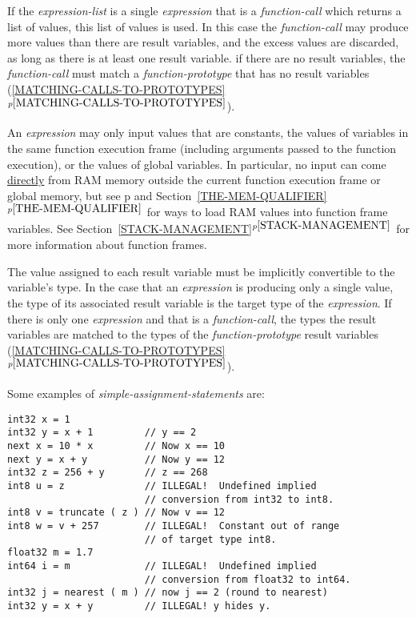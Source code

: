 \documentclass[12pt]{article}
\newcommand{\itemref}[1]{\ref{#1}$^{p\pageref{#1}}$}
\newcommand{\pagref}[1]{p\pageref{#1}}
\newenvironment{indpar}[1][0.3in]%
	{\begin{list}{}%
		     {\setlength{\itemsep}{0in}%
		      \setlength{\topsep}{0in}%
		      \setlength{\parsep}{1ex}%
		      \setlength{\labelwidth}{#1}%
		      \setlength{\leftmargin}{#1}%
		      \addtolength{\leftmargin}{\labelsep}}%
	 \item}%
	{\end{list}}
\begin{document}
If the {\em expression-list} is a single {\em expression} that
is a {\em function-call} which
returns a list of values, this list of values is used.
In this case the {\em function-call} may produce more values than
there are result variables, and the excess values are discarded,
as long as there is at least one result variable.
if there are no result variables, the
{\em function-call} must match a {\em function-prototype} that has
no result variables (\itemref{MATCHING-CALLS-TO-PROTOTYPES}).

An {\em expression} may only input values that are constants,
the values of variables in the same function execution
frame (including arguments passed to the function execution), 
or the values of global variables.  In particular,
no input can come \underline{directly}
from RAM memory outside the current function execution frame or
global memory,
but see \pagref{MEM} and Section~\itemref{THE-MEM-QUALIFIER}
for ways to load RAM values into function frame variables.
See Section~\itemref{STACK-MANAGEMENT} for more information about
function frames.

The value assigned to each result variable must be implicitly convertible to
the variable's type.
In the case that an {\em expression} is producing
only a single value, the type of its associated result variable is the target
type of the {\em expression}.  If there is only one {\em expression}
and that is a {\em function-call}, the types the result variables
are matched to the types of the {\em function-prototype} result
variables (\itemref{MATCHING-CALLS-TO-PROTOTYPES}).

Some examples of {\em simple-assignment-statements} are:
\begin{indpar}\begin{verbatim}
int32 x = 1
int32 y = x + 1         // y == 2
next x = 10 * x         // Now x == 10
next y = x + y          // Now y == 12
int32 z = 256 + y       // z == 268
int8 u = z              // ILLEGAL!  Undefined implied
                        // conversion from int32 to int8.
int8 v = truncate ( z ) // Now v == 12
int8 w = v + 257        // ILLEGAL!  Constant out of range
                        // of target type int8.
float32 m = 1.7
int64 i = m             // ILLEGAL!  Undefined implied
                        // conversion from float32 to int64.
int32 j = nearest ( m ) // now j == 2 (round to nearest)
int32 y = x + y         // ILLEGAL! y hides y.
\end{verbatim}\end{indpar}
\end{document}
